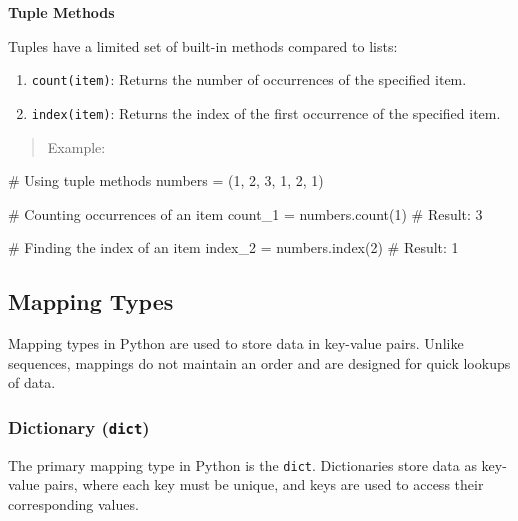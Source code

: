 \documentclass[
  letterpaper,
  DIV=11,
  numbers=noendperiod]{scrreprt}
\newenvironment{Shaded}{\begin{snugshade}}{\end{snugshade}}
\newcommand{\CommentTok}[1]{\textcolor[rgb]{0.37,0.37,0.37}{#1}}
\newcommand{\DecValTok}[1]{\textcolor[rgb]{0.68,0.00,0.00}{#1}}
\newcommand{\NormalTok}[1]{\textcolor[rgb]{0.00,0.23,0.31}{#1}}
\newcommand{\OperatorTok}[1]{\textcolor[rgb]{0.37,0.37,0.37}{#1}}
\providecommand{\tightlist}{%
  \setlength{\itemsep}{0pt}\setlength{\parskip}{0pt}}\usepackage{longtable,booktabs,array}
\theoremstyle{plain}
\theoremstyle{definition}
\theoremstyle{remark}
\begin{document}
\textbf{Tuple Methods}

Tuples have a limited set of built-in methods compared to lists:

\begin{enumerate}
\def\labelenumi{\arabic{enumi}.}
\tightlist
\item
  \texttt{count(item)}: Returns the number of occurrences of the
  specified item.
\item
  \texttt{index(item)}: Returns the index of the first occurrence of the
  specified item.
\end{enumerate}

\begin{quote}
Example:
\end{quote}

\begin{Shaded}
\begin{Highlighting}[]
\CommentTok{\# Using tuple methods}
\NormalTok{numbers }\OperatorTok{=}\NormalTok{ (}\DecValTok{1}\NormalTok{, }\DecValTok{2}\NormalTok{, }\DecValTok{3}\NormalTok{, }\DecValTok{1}\NormalTok{, }\DecValTok{2}\NormalTok{, }\DecValTok{1}\NormalTok{)}

\CommentTok{\# Counting occurrences of an item}
\NormalTok{count\_1 }\OperatorTok{=}\NormalTok{ numbers.count(}\DecValTok{1}\NormalTok{)  }\CommentTok{\# Result: 3}

\CommentTok{\# Finding the index of an item}
\NormalTok{index\_2 }\OperatorTok{=}\NormalTok{ numbers.index(}\DecValTok{2}\NormalTok{)  }\CommentTok{\# Result: 1}
\end{Highlighting}
\end{Shaded}

\subsection{Mapping Types}\label{mapping-types}

Mapping types in Python are used to store data in key-value pairs.
Unlike sequences, mappings do not maintain an order and are designed for
quick lookups of data.

\subsubsection{\texorpdfstring{Dictionary
(\texttt{dict})}{Dictionary (dict)}}\label{dictionary-dict}

The primary mapping type in Python is the \texttt{dict}. Dictionaries
store data as key-value pairs, where each key must be unique, and keys
are used to access their corresponding values.
\end{document}
